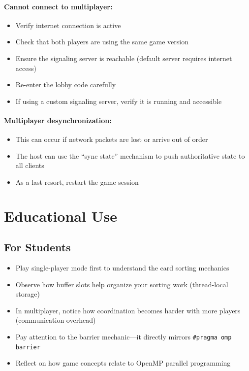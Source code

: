 \paragraph*{Cannot connect to multiplayer:}
\begin{itemize}
    \item Verify internet connection is active
    \item Check that both players are using the same game version
    \item Ensure the signaling server is reachable (default server requires internet access)
    \item Re-enter the lobby code carefully
    \item If using a custom signaling server, verify it is running and accessible
\end{itemize}

\paragraph*{Multiplayer desynchronization:}
\begin{itemize}
    \item This can occur if network packets are lost or arrive out of order
    \item The host can use the ``sync state'' mechanism to push authoritative state to all clients
    \item As a last resort, restart the game session
\end{itemize}

\section{Educational Use}
\label{app:a:educational-use}

\subsection{For Students}

\begin{itemize}
    \item Play single-player mode first to understand the card sorting mechanics
    \item Observe how buffer slots help organize your sorting work (thread-local storage)
    \item In multiplayer, notice how coordination becomes harder with more players (communication overhead)
    \item Pay attention to the barrier mechanic---it directly mirrors \texttt{\#pragma omp barrier}
    \item Reflect on how game concepts relate to OpenMP parallel programming
\end{itemize}

